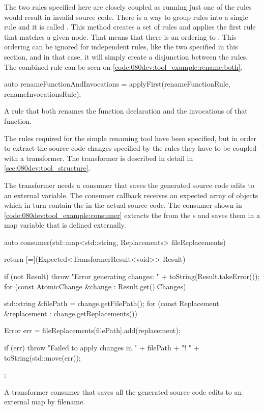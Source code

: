 The two rules specified here are closely coupled as running just one of the rules would result in invalid source code. There is a way to group rules into a single rule and it is called . This method creates a set of rules and applies the first rule that matches a given node. That means that there is an ordering to . This ordering can be ignored for independent rules, like the two specified in this section, and in that case, it will simply create a disjunction between the rules. The combined rule can be seen on \cref{code:080dev:tool_example:rename:both}.

\begin{listing}[H]
    \begin{cppcode}
auto renameFunctionAndInvocations = applyFirst({renameFunctionRule, renameInvocationsRule});
    \end{cppcode}
    \caption{A rule that both renames the function declaration and the invocations of that function.}
    \label{code:080dev:tool_example:rename:both}
\end{listing}

The rules required for the simple renaming tool have been specified, but in order to extract the source code changes specified by the rules they have to be coupled with a transformer. The transformer is described in detail in \cref{sec:080dev:tool_structure}.

The transformer needs a consumer that saves the generated source code edits to an external variable. The consumer callback receives an expected array of  objects which in turn contain the  in the actual source code. The consumer shown in \cref{code:080dev:tool_example:consumer} extracts the  from the s and saves them in a map variable that is defined externally.

\begin{listing}[H]
    \begin{cppcode}
auto consumer(std::map<std::string, Replacements> fileReplacements) {
    return [=](Expected<TransformerResult<void>> Result) {
        if (not Result) {
            throw "Error generating changes: " + toString(Result.takeError());
        }
        for (const AtomicChange &change : Result.get().Changes) {
            std::string &filePath = change.getFilePath();
            for (const Replacement &replacement : change.getReplacements()) {
                Error err = fileReplacements[filePath].add(replacement);

                if (err) {
                    throw "Failed to apply changes in " + filePath + "! " + toString(std::move(err));
                }
            }
        }
    };
}
    \end{cppcode}
    \caption{A transformer consumer that saves all the generated source code edits to an external map by filename.}
    \label{code:080dev:tool_example:consumer}
\end{listing}

